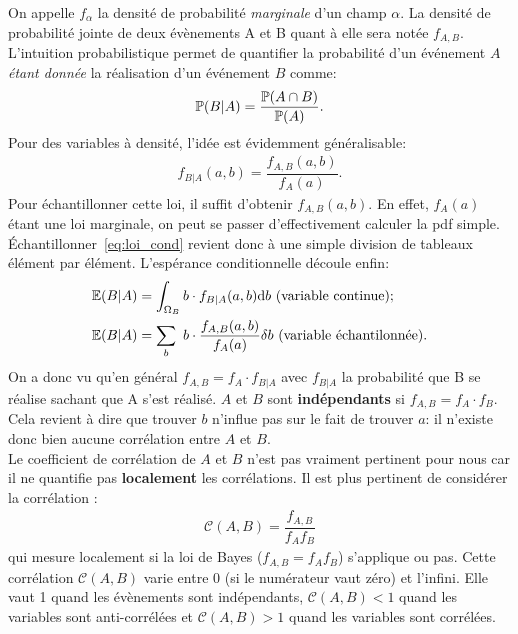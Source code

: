 \documentclass[13pt, a4paper]{extarticle}
\begin{document}
\noindent On appelle $f_\alpha$ la densité de probabilité \emph{marginale} d'un champ
$\alpha$. La densité de probabilité jointe de deux évènements A et B quant à elle sera notée $f_{A,B}$. 
L'intuition probabilistique permet de quantifier la probabilité d'un événement
$A$ \emph{étant donnée} la réalisation d'un événement $B$ comme:
\begin{align}
    \mathbb{P}\qty(B|A) = \dfrac{\mathbb{P}\qty(A\cap B)}{\mathbb{P}(A)}.
\end{align}
Pour des variables à densité, l'idée est évidemment généralisable:
\begin{align}
    f_{B|A}(a,b) = \dfrac{f_{A,B}(a,b)}{f_{A}(a)}.
    \label{eq:loi_cond}
\end{align}
Pour échantillonner cette loi, il suffit d'obtenir $f_{A,B}(a,b)$. 
En effet, $f_{A}(a)$ étant une loi marginale, on peut se passer
d'effectivement calculer la pdf simple. 
Échantillonner~\eqref{eq:loi_cond} revient donc à une simple division de tableaux
élément par élément. L'espérance conditionnelle découle enfin:
\begin{align}
    \mathbb{E}\qty(B|A) &= \int_{\Omega_B}b\cdot f_{B|A}(a,b)\dd b~\text{(variable continue)};\\
    \mathbb{E}\qty(B|A) &= \sum_b~b\cdot\dfrac{f_{A,B}(a,b)}{f_{A}(a)}\delta b~\text{(variable échantilonnée)}.
\end{align}
On a donc vu qu'en général $f_{A,B} = f_{A}\cdot f_{B|A}$ avec $f_{B|A}$ la probabilité 
que B se réalise sachant que A s'est réalisé. $A$ et $B$ sont {\bf indépendants} 
si $f_{A,B} = f_A\cdot f_B$. Cela revient à dire que trouver $b$ n'influe pas
sur le fait de trouver $a$: il n'existe donc bien aucune corrélation entre $A$ et $B$. \\
Le coefficient de corrélation de $A$ et $B$ n'est pas vraiment
pertinent pour nous car il ne quantifie pas {\bf localement} les corrélations.
Il est plus pertinent de considérer la corrélation :
\begin{align}
    \mathcal{C}(A,B) = \dfrac{f_{A,B}}{f_{A}f_{B}}
    \label{eq:correlations}
\end{align}
qui mesure localement si la loi de Bayes ($f_{A,B}=f_{A}f_{B}$) s'applique ou pas. 
Cette corrélation $\mathcal{C}(A,B)$ varie entre 0 (si le numérateur vaut zéro) et 
l'infini. Elle vaut 1 quand les évènements sont indépendants,  $\mathcal{C}(A,B)< 1$ 
quand les variables sont anti-corrélées et  $\mathcal{C}(A,B)> 1$ quand les variables sont corrélées.\\
\end{document}
